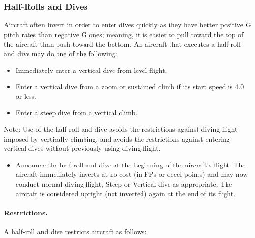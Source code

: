 \subsubsection{Half-Rolls and Dives}

Aircraft often invert in order to enter dives quickly as they have better positive G pitch rates than negative G ones; meaning, it is easier to pull toward the top of the aircraft than push toward the bottom. An aircraft that executes a half-roll and dive may do one of the following:

\begin{itemize}

    \item Immediately enter a vertical dive from level flight.

    \item Enter a vertical dive from a zoom or sustained climb if its start speed is 4.0 or less.

    \item Enter a steep dive from a vertical climb.

\end{itemize}

Note: Use of the half-roll and dive avoids the restrictions against diving flight imposed by vertically climbing, and avoids the restrictions against entering vertical dives without previously using diving flight.                                         

\begin{itemize}
    \item{} Announce the half-roll and dive at the beginning of the aircraft's flight. The aircraft immediately inverts at no cost (in FPs or decel points) and may now conduct normal diving flight, Steep or Vertical dive as appropriate. The aircraft is considered upright (not inverted) again at the end of its flight.
\end{itemize}

\paragraph{Restrictions.} A half-roll and dive restricts aircraft as follows:

